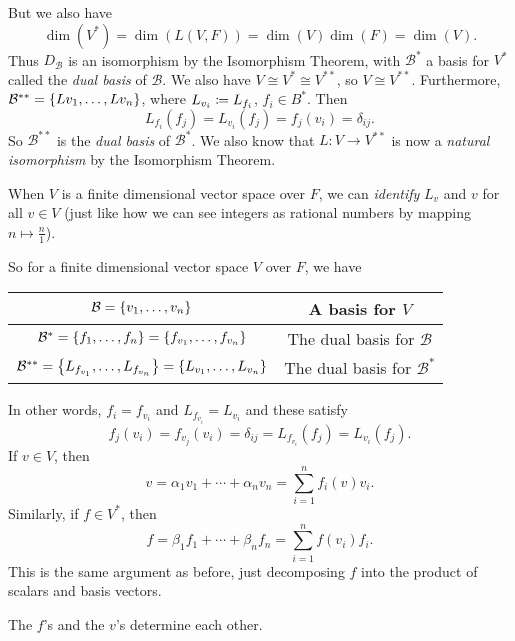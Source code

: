 \documentclass[class=article, crop=false]{standalone}
\begin{document}
  But we also have
  \[
    \dim(V^*) = \dim(L(V, F)) = \dim(V)\dim(F) = \dim(V).
  \]
  Thus $D_{\mathcal{B}}$ is an isomorphism by the Isomorphism Theorem, with $\mathcal{B}^*$ a basis for $V^*$ called the \emph{dual basis} of $\mathcal{B}$. We also have $V\cong V^*\cong V^{* *}$, so $V\cong V^{* *}$. Furthermore, $\mathcal{B}^{* *} = \left\{Lv_1,\dotsc,Lv_n\right\}$, where $L_{v_i}\coloneqq L_{f_i}$, $f_i\in B^*$. Then
  \[
    L_{f_i}(f_j) = L_{v_i}(f_j) = f_j(v_i) = \delta_{ij}.
  \]
  So $\mathcal{B}^{* *}$ is the \emph{dual basis} of $\mathcal{B}^*$. We also know that $L\colon V\to V^{* *}$ is now a \emph{natural isomorphism} by the Isomorphism Theorem. \par
  When $V$ is a finite dimensional vector space over $F$, we can \emph{identify} $L_v$ and $v$ for all $v\in V$ (just like how we can see integers as rational numbers by mapping $n\mapsto \frac{n}{1}$). \par
  So for a finite dimensional vector space $V$ over $F$, we have
  \begin{center}\begin{tabular}{c|c}
    $\mathcal{B} = \left\{v_1,\dotsc,v_n\right\}$ & A basis for $V$ \\
    \hline
    $\mathcal{B}^* = \left\{f_1,\dotsc,f_n\right\} = \left\{f_{v_1},\dotsc,f_{v_n}\right\}$ & The dual basis for $\mathcal{B}$ \\
    \hline
    $\mathcal{B}^{* *} = \left\{L_{f_{v_1}},\dotsc,L_{f_{v_n}}\right\} = \left\{L_{v_1},\dotsc,L_{v_n}\right\}$ & The dual basis for $\mathcal{B}^*$
  \end{tabular}\end{center}
  In other words, $f_i = f_{v_i}$ and $L_{f_{v_i}} = L_{v_i}$ and these satisfy
  \[
    f_j(v_i) = f_{v_j}(v_i) = \delta_{ij} = L_{f_{v_i}}(f_j) = L_{v_i}(f_j).
  \]
  If $v\in V$, then
  \[
    v = \alpha_1v_1 + \dotsb + \alpha_nv_n = \sum_{i=1}^{n}f_i(v)v_i. \tag{For unique $\alpha_1,\dotsc,\alpha_n\in F$}
  \]
  Similarly, if $f\in V^*$, then
  \[
    f = \beta_1f_1 + \dotsb + \beta_nf_n = \sum_{i=1}^{n}f(v_i)f_i.
  \]
  This is the same argument as before, just decomposing $f$ into the product of scalars and basis vectors.
  \begin{note}{}
    The $f$'s and the $v$'s determine each other.
  \end{note}
\end{document}
